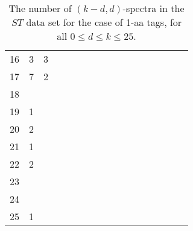 \documentclass{article}
\begin{document}
\begin{table}[h]
{\begin{tabular}{|c|c|
c|c|c|c|c|c|c|c|c|c|c|c|c|c|c|}
16  & 3 & 3 &  &  &  &  &  &  &  &  &  &  &  &  &  & \\

17  & 7 & 2 &  &  &  &  &  &  &  &  &  &  &  &  &  & \\

18  &  &  &  &  &  &  &  &  &  &  &  &  &  &  &  & \\

19  & 1 &  &  &  &  &  &  &  &  &  &  &  &  &  &  & \\

20  & 2 &  &  &  &  &  &  &  &  &  &  &  &  &  &  & \\

21  & 1 &  &  &  &  &  &  &  &  &  &  &  &  &  &  & \\

22  & 2 &  &  &  &  &  &  &  &  &  &  &  &  &  &  & \\

23  &  &  &  &  &  &  &  &  &  &  &  &  &  &  &  & \\

24  &  &  &  &  &  &  &  &  &  &  &  &  &  &  &  & \\

25  & 1 &  &  &  &  &  &  &  &  &  &  &  &  &  &  & \\

  \hline
\end{tabular}
\par}
\centering
\caption{The number of $(k-d,d)$-spectra in the $ST$ data set for the case of 1-aa tags, for all $0\le d\le k\le 25$.}
\vspace{3mm}
\label{table:kd-1-ST}
\end{table}
\end{document}
